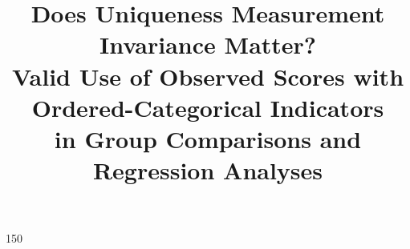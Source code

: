 



\title[MI Categorical]{Does Uniqueness Measurement Invariance Matter? \\ Valid Use of Observed Scores with Ordered-Categorical Indicators \\ in Group Comparisons and Regression Analyses}

\usepackage{fancyvrb}
\usepackage{color,xcolor}
\usepackage{framed}
\usepackage{booktabs}
\usepackage{longtable}
\usepackage{array}
\usepackage{multirow}
\usepackage{wrapfig}
\usepackage{float}
\usepackage{colortbl}
\usepackage{pdflscape}
\usepackage{tabu}
\usepackage{threeparttable}
\usepackage{threeparttablex}
\usepackage[normalem]{ulem}
\usepackage{makecell}
\usepackage{tcolorbox}



\makeatletter
\def\verbatim{\footnotesize\@verbatim \frenchspacing\@vobeyspaces \@xverbatim}
\makeatother
\setlength{\parskip}{0pt}
\setlength{\OuterFrameSep}{-4pt}
\makeatletter
\preto{\@verbatim}{\topsep=-10pt \partopsep=-10pt }
\makeatother

\renewcommand{\tightlist}{\setlength{\itemsep}{1ex}\setlength{\parskip}{0pt}}

\usepackage[fontsize=9pt]{scrextend}

  
\newcommand{\bv}[1]{\boldsymbol{\mathbf{#1}}}  %

 150
